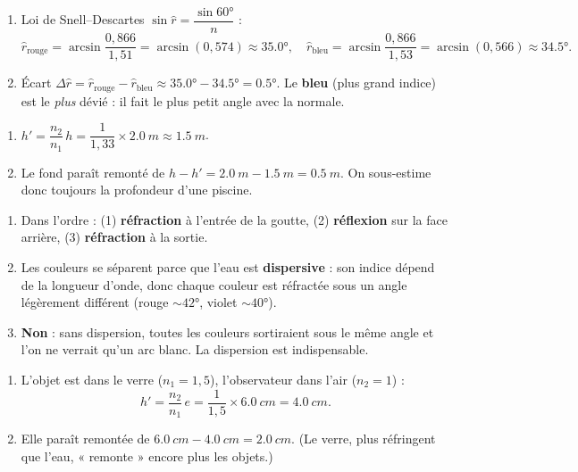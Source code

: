 \documentclass[11pt,a4paper]{article}
\begin{document}
\begin{corrige}
\begin{enumerate}[label=\alph*)]
  \item Loi de Snell–Descartes $\sin\hat r=\dfrac{\sin\ang{60}}{n}$ :
        \[ \hat r_{\text{rouge}}=\arcsin\!\frac{0{,}866}{1{,}51}=\arcsin(0{,}574)\approx\ang{35.0},\quad
           \hat r_{\text{bleu}}=\arcsin\!\frac{0{,}866}{1{,}53}=\arcsin(0{,}566)\approx\ang{34.5}. \]
  \item Écart $\Delta\hat r=\hat r_{\text{rouge}}-\hat r_{\text{bleu}}\approx\ang{35.0}-\ang{34.5}=\ang{0.5}$.
        Le \textbf{bleu} (plus grand indice) est le \emph{plus} dévié : il fait le plus petit angle avec
        la normale.
\end{enumerate}
\end{corrige}

\begin{corrige}
\begin{enumerate}[label=\alph*)]
  \item $h'=\dfrac{n_2}{n_1}\,h=\dfrac{1}{1{,}33}\times\qty{2.0}{m}\approx\qty{1.5}{m}$.
  \item Le fond paraît remonté de $h-h'=\qty{2.0}{m}-\qty{1.5}{m}=\qty{0.5}{m}$. On sous-estime donc
        toujours la profondeur d'une piscine.
\end{enumerate}
\end{corrige}

\begin{corrige}
\begin{enumerate}[label=\alph*)]
  \item Dans l'ordre : (1) \textbf{réfraction} à l'entrée de la goutte, (2) \textbf{réflexion} sur la
        face arrière, (3) \textbf{réfraction} à la sortie.
  \item Les couleurs se séparent parce que l'eau est \textbf{dispersive} : son indice dépend de la
        longueur d'onde, donc chaque couleur est réfractée sous un angle légèrement différent (rouge
        $\sim\ang{42}$, violet $\sim\ang{40}$).
  \item \textbf{Non} : sans dispersion, toutes les couleurs sortiraient sous le même angle et l'on ne
        verrait qu'un arc blanc. La dispersion est indispensable.
\end{enumerate}
\end{corrige}

\begin{corrige}
\begin{enumerate}[label=\alph*)]
  \item L'objet est dans le verre ($n_1=1{,}5$), l'observateur dans l'air ($n_2=1$) :
        \[ h'=\frac{n_2}{n_1}\,e=\frac{1}{1{,}5}\times\qty{6.0}{cm}=\qty{4.0}{cm}. \]
  \item Elle paraît remontée de $\qty{6.0}{cm}-\qty{4.0}{cm}=\qty{2.0}{cm}$. (Le verre, plus
        réfringent que l'eau, « remonte » encore plus les objets.)
\end{enumerate}
\end{corrige}
\end{document}
